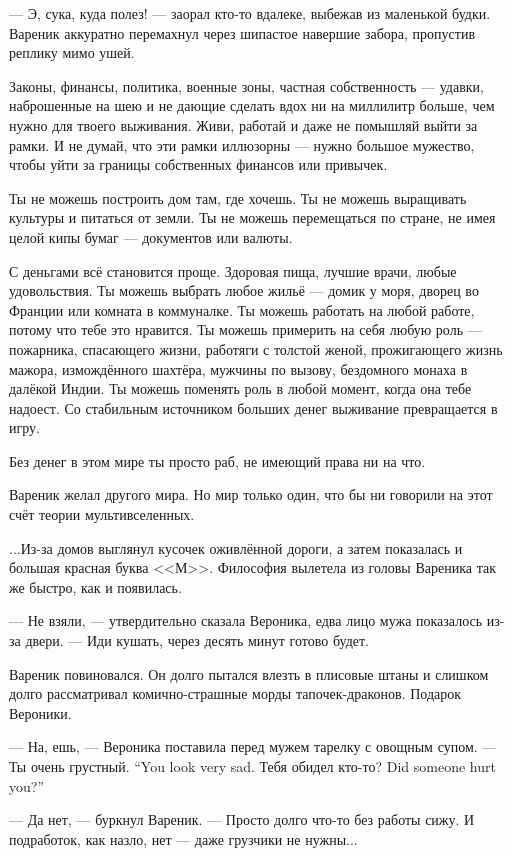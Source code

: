 --- Э, сука, куда полез! --- заорал кто-то вдалеке, выбежав из маленькой будки.
Вареник аккуратно перемахнул через шипастое навершие забора, пропустив реплику мимо ушей.

Законы, финансы, политика, военные зоны, частная собственность --- удавки, наброшенные на шею и не дающие сделать вдох ни на миллилитр больше, чем нужно для твоего выживания.
Живи, работай и даже не помышляй выйти за рамки.
И не думай, что эти рамки иллюзорны --- нужно большое мужество, чтобы уйти за границы собственных финансов или привычек.

Ты не можешь построить дом там, где хочешь.
Ты не можешь выращивать культуры и питаться от земли.
Ты не можешь перемещаться по стране, не имея целой кипы бумаг --- документов или валюты.

С деньгами всё становится проще.
Здоровая пища, лучшие врачи, любые удовольствия.
Ты можешь выбрать любое жильё --- домик у моря, дворец во Франции или комната в коммуналке.
Ты можешь работать на любой работе, потому что тебе это нравится.
Ты можешь примерить на себя любую роль --- пожарника, спасающего жизни, работяги с толстой женой, прожигающего жизнь мажора, измождённого шахтёра, мужчины по вызову, бездомного монаха в далёкой Индии.
Ты можешь поменять роль в любой момент, когда она тебе надоест.
Со стабильным источником больших денег выживание превращается в игру.

Без денег в этом мире ты просто раб, не имеющий права ни на что.

Вареник желал другого мира.
Но мир только один, что бы ни говорили на этот счёт теории мультивселенных.

...Из-за домов выглянул кусочек оживлённой дороги, а затем показалась и большая красная буква <<М>>.
Философия вылетела из головы Вареника так же быстро, как и появилась.

\asterism

--- Не взяли, --- утвердительно сказала Вероника, едва лицо мужа показалось из-за двери.
--- Иди кушать, через десять минут готово будет.

Вареник повиновался.
Он долго пытался влезть в плисовые штаны и слишком долго рассматривал комично-страшные морды тапочек-драконов.
Подарок Вероники.

--- На, ешь, --- Вероника поставила перед мужем тарелку с овощным супом.
{--- Ты очень грустный.}
{``You look very sad.}
{Тебя обидел кто-то?}
{Did someone hurt you?''}

--- Да нет, --- буркнул Вареник.
--- Просто долго что-то без работы сижу.
И подработок, как назло, нет --- даже грузчики не нужны...

